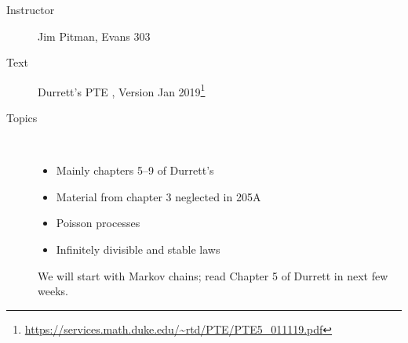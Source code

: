 
\begin{description}
  \item[Instructor] Jim Pitman, Evans 303
  \item[Text] Durrett's PTE \citep{durrett2019probability}, Version Jan 2019\footnote{\url{https://services.math.duke.edu/~rtd/PTE/PTE5_011119.pdf}}
  \item[Topics]~
    \begin{itemize}
      \item Mainly chapters 5--9 of Durrett's
      \item Material from chapter 3 neglected in 205A
      \item Poisson processes
      \item Infinitely divisible and stable laws
    \end{itemize}
    We will start with Markov chains; read Chapter 5 of Durrett in
    next few weeks.
\end{description}





